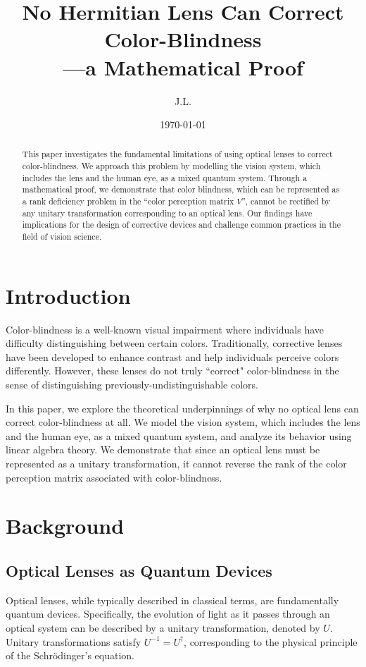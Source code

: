 \documentclass[10pt,a4paper]{article}
\title{No Hermitian Lens Can Correct Color-Blindness\\---a Mathematical Proof}
\author{J.L.}
\date{\today}
\theoremstyle{definition}
\theoremstyle{remark}
\numberwithin{equation}{section}
\begin{document}
\maketitle

\begin{abstract}
This paper investigates the fundamental limitations of using optical lenses to correct color-blindness. We approach this problem by modelling the vision system, which includes the lens and the human eye, as a mixed quantum system. Through a mathematical proof, we demonstrate that color blindness, which can be represented as a rank deficiency problem in the ``color perception matrix $V$'', cannot be rectified by any unitary transformation corresponding to an optical lens. Our findings have implications for the design of corrective devices and challenge common practices in the field of vision science.
\end{abstract}

\section{Introduction}
Color-blindness is a well-known visual impairment where individuals have difficulty distinguishing between certain colors. Traditionally, corrective lenses have been developed to enhance contrast and help individuals perceive colors differently. However, these lenses do not truly ``correct" color-blindness in the sense of distinguishing previously-undistinguishable colors. 

In this paper, we explore the theoretical underpinnings of why no optical lens can correct color-blindness at all. We model the vision system, which includes the lens and the human eye, as a mixed quantum system, and analyze its behavior using linear algebra theory. We demonstrate that since an optical lens must be represented as a unitary transformation, it cannot reverse the rank of the color perception matrix associated with color-blindness.

\section{Background}
\subsection{Optical Lenses as Quantum Devices}
Optical lenses, while typically described in classical terms, are fundamentally quantum devices. Specifically, the evolution of light as it passes through an optical system can be described by a unitary transformation, denoted by \( U \). Unitary transformations satisfy  \( U^{-1}= U^\dagger \), corresponding to the physical principle of the Schr\"{o}dinger's equation.
\end{document}
